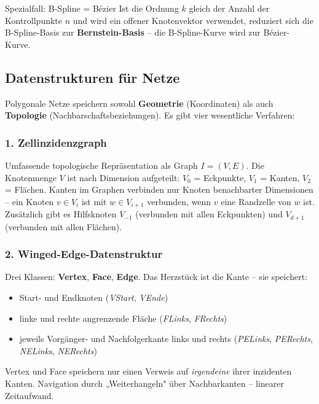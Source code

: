 \documentclass[12pt, a4paper]{article}
\begin{document}
\begin{notebox}{Spezialfall: B-Spline = Bézier}
Ist die Ordnung $k$ gleich der Anzahl der Kontrollpunkte $n$ und wird ein offener Knotenvektor verwendet, reduziert sich die B-Spline-Basis zur \textbf{Bernstein-Basis} -- die B-Spline-Kurve wird zur Bézier-Kurve.
\end{notebox}

\subsection{Datenstrukturen für Netze}

Polygonale Netze speichern sowohl \textbf{Geometrie} (Koordinaten) als auch \textbf{Topologie} (Nachbarschaftsbeziehungen). Es gibt vier wesentliche Verfahren:

\subsubsection*{1. Zellinzidenzgraph}

Umfassende topologische Repräsentation als Graph $I = (V, E)$. Die Knotenmenge $V$ ist nach Dimension aufgeteilt: $V_0$ = Eckpunkte, $V_1$ = Kanten, $V_2$ = Flächen. Kanten im Graphen verbinden nur Knoten benachbarter Dimensionen -- ein Knoten $v \in V_i$ ist mit $w \in V_{i+1}$ verbunden, wenn $v$ eine Randzelle von $w$ ist. Zusätzlich gibt es Hilfsknoten $V_{-1}$ (verbunden mit allen Eckpunkten) und $V_{d+1}$ (verbunden mit allen Flächen).

\subsubsection*{2. Winged-Edge-Datenstruktur}

Drei Klassen: \textbf{Vertex}, \textbf{Face}, \textbf{Edge}. Das Herzstück ist die Kante -- sie speichert:
\begin{itemize}
  \item Start- und Endknoten (\textit{VStart}, \textit{VEnde})
  \item linke und rechte angrenzende Fläche (\textit{FLinks}, \textit{FRechts})
  \item jeweils Vorgänger- und Nachfolgerkante links und rechts (\textit{PELinks}, \textit{PERechts}, \textit{NELinks}, \textit{NERechts})
\end{itemize}
Vertex und Face speichern nur einen Verweis auf \textit{irgendeine} ihrer inzidenten Kanten. Navigation durch „Weiterhangeln" über Nachbarkanten -- linearer Zeitaufwand.
\end{document}
